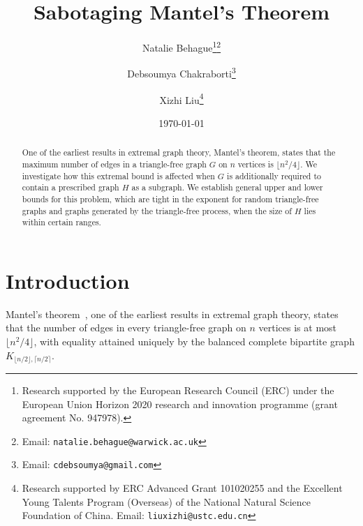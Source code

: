 \documentclass[11pt,a4paper]{article}
\newcommand{\graph}{H}
\begin{document}
\title{\bf\Large Sabotaging Mantel's Theorem}
\date{\today}
\author[1]{Natalie Behague\thanks{Research supported by the European Research Council (ERC) under the European Union Horizon 2020 research and innovation programme (grant agreement No. 947978).}\thanks{Email: \texttt{natalie.behague@warwick.ac.uk}}}
%
\author[2]{Debsoumya Chakraborti\protect\footnotemark[1]\thanks{Email: \texttt{cdebsoumya@gmail.com}}%
}
%
\author[3]{Xizhi Liu\thanks{Research supported by ERC Advanced Grant 101020255 and the Excellent Young Talents Program (Overseas) of the National Natural Science Foundation of China. Email: \texttt{liuxizhi@ustc.edu.cn}}}
\maketitle
\begin{abstract}
%
One of the earliest results in extremal graph theory, Mantel's theorem, states that the maximum number of edges in a triangle-free graph $G$ on $n$ vertices is $\lfloor n^2/4 \rfloor$. 
We investigate how this extremal bound is affected when $G$ is additionally required to contain a prescribed graph $\graph$ as a subgraph. 
We establish general upper and lower bounds for this problem, which are tight in the exponent for random triangle-free graphs and graphs generated by the triangle-free process, when the size of $\graph$ lies within certain ranges. 
%
\end{abstract}
\section{Introduction}\label{SEC:Introduction}

Mantel's theorem~\cite{Mantel07}, one of the earliest results in extremal graph theory, states that the number of edges in every triangle-free graph on $n$ vertices is at most $\lfloor n^2/4 \rfloor$, with equality attained  uniquely by the balanced complete bipartite graph $K_{\lfloor n/2\rfloor,\lceil n/2\rceil}$. 
\end{document}
